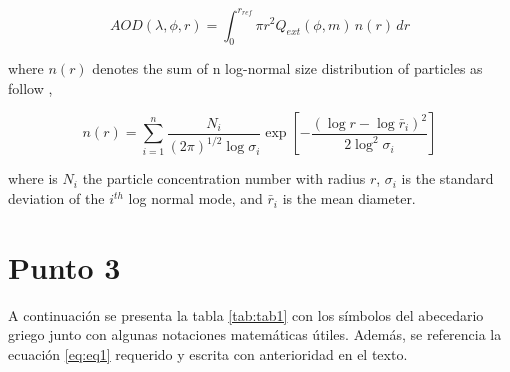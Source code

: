\documentclass[10pt]{article}
\begin{document}
    \begin{equation}
        AOD\left(\lambda,\phi,r \right) = \int_{0}^{r_{ref}} \pi r^2 Q_{ext}\left(\phi, m \right) \, n\left(r \right) \, dr
    \end{equation}

    where $ n(r) $ denotes the sum of n log-normal size distribution of particles as follow \cite{cite},

    \begin{equation}
        n\left(r \right) = \sum_{i = 1}^{n} \frac{N_{i}}{(2\pi)^{1/2} \log\sigma_{i}} \exp \left[-\frac{(\log r - \log \bar{r}_{i})^2}{2 \log^2\sigma_{i}}  \right]
        \label{eq:eq1}
    \end{equation}

    where is $ N_{i} $ the particle concentration number with radius $ r $, $ \sigma_{i} $ is the standard deviation of the $ i^{th} $ log normal mode, and $ \bar{r}_{i} $ is the mean diameter.


    \section*{Punto 3}

    A continuación se presenta la tabla \ref{tab:tab1} con los símbolos del abecedario griego junto con algunas notaciones matemáticas útiles. Además, se referencia la ecuación \ref{eq:eq1} requerido y escrita con anterioridad en el texto.
\end{document}

